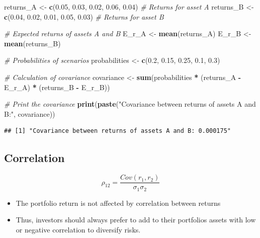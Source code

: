 \documentclass[
]{book}
\newenvironment{Shaded}{\begin{snugshade}}{\end{snugshade}}
\newcommand{\CommentTok}[1]{\textcolor[rgb]{0.56,0.35,0.01}{\textit{#1}}}
\newcommand{\FloatTok}[1]{\textcolor[rgb]{0.00,0.00,0.81}{#1}}
\newcommand{\FunctionTok}[1]{\textcolor[rgb]{0.13,0.29,0.53}{\textbf{#1}}}
\newcommand{\NormalTok}[1]{#1}
\newcommand{\OtherTok}[1]{\textcolor[rgb]{0.56,0.35,0.01}{#1}}
\newcommand{\SpecialCharTok}[1]{\textcolor[rgb]{0.81,0.36,0.00}{\textbf{#1}}}
\newcommand{\StringTok}[1]{\textcolor[rgb]{0.31,0.60,0.02}{#1}}
\begin{document}
\begin{Shaded}
\begin{Highlighting}[]
\NormalTok{returns\_A }\OtherTok{\textless{}{-}} \FunctionTok{c}\NormalTok{(}\FloatTok{0.05}\NormalTok{, }\FloatTok{0.03}\NormalTok{, }\FloatTok{0.02}\NormalTok{, }\FloatTok{0.06}\NormalTok{, }\FloatTok{0.04}\NormalTok{)  }\CommentTok{\# Returns for asset A}
\NormalTok{returns\_B }\OtherTok{\textless{}{-}} \FunctionTok{c}\NormalTok{(}\FloatTok{0.04}\NormalTok{, }\FloatTok{0.02}\NormalTok{, }\FloatTok{0.01}\NormalTok{, }\FloatTok{0.05}\NormalTok{, }\FloatTok{0.03}\NormalTok{)  }\CommentTok{\# Returns for asset B}

\CommentTok{\# Expected returns of assets A and B}
\NormalTok{E\_r\_A }\OtherTok{\textless{}{-}} \FunctionTok{mean}\NormalTok{(returns\_A)}
\NormalTok{E\_r\_B }\OtherTok{\textless{}{-}} \FunctionTok{mean}\NormalTok{(returns\_B)}

\CommentTok{\# Probabilities of scenarios}
\NormalTok{probabilities }\OtherTok{\textless{}{-}} \FunctionTok{c}\NormalTok{(}\FloatTok{0.2}\NormalTok{, }\FloatTok{0.15}\NormalTok{, }\FloatTok{0.25}\NormalTok{, }\FloatTok{0.1}\NormalTok{, }\FloatTok{0.3}\NormalTok{)}

\CommentTok{\# Calculation of covariance}
\NormalTok{covariance }\OtherTok{\textless{}{-}} \FunctionTok{sum}\NormalTok{(probabilities }\SpecialCharTok{*}\NormalTok{ (returns\_A }\SpecialCharTok{{-}}\NormalTok{ E\_r\_A) }\SpecialCharTok{*}\NormalTok{ (returns\_B }\SpecialCharTok{{-}}\NormalTok{ E\_r\_B))}

\CommentTok{\# Print the covariance}
\FunctionTok{print}\NormalTok{(}\FunctionTok{paste}\NormalTok{(}\StringTok{"Covariance between returns of assets A and B:"}\NormalTok{, covariance))}
\end{Highlighting}
\end{Shaded}

\begin{verbatim}
## [1] "Covariance between returns of assets A and B: 0.000175"
\end{verbatim}

\hypertarget{correlation}{%
\subsection{Correlation}\label{correlation}}

\[{\rho_12} = \frac{Cov(r_1,r_2 )}{\sigma_1 \sigma_2}\]

\begin{itemize}
\item
  The portfolio return is not affected by correlation between returns
\item
  Thus, investors should always prefer to add to their portfolios assets with low or negative correlation to diversify risks.
\end{itemize}
\end{document}
